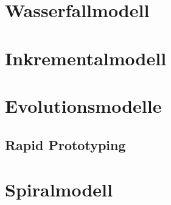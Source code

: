 \documentclass[a4paper, twopage]{scrreprt}
\begin{document}
\chapter{Wasserfallmodell}
\label{ch:wasserfallmodell}


\chapter{Inkrementalmodell}

\chapter{Evolutionsmodelle}

\section{Rapid Prototyping}

\chapter{Spiralmodell}


\nocite{*}
\printbibliography

\listoffigures
\end{document}
